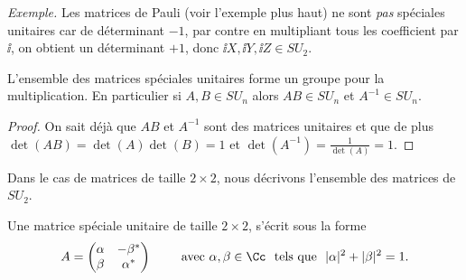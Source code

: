 \documentclass[11pt,class=report,crop=false]{standalone}
\begin{document}
\emph{Exemple.} Les matrices de Pauli (voir l'exemple plus haut) ne sont \emph{pas} spéciales unitaires car de déterminant $-1$, par contre en multipliant tous les coefficient par $\ii$, on obtient un déterminant $+1$, donc $\ii X, \ii Y, \ii Z \in SU_2$.

\begin{proposition}
L'ensemble des matrices spéciales unitaires forme un groupe pour la multiplication.
En particulier si $A, B \in SU_n$ alors $AB \in SU_n$ et $A^{-1} \in SU_n$.
\end{proposition}

\begin{proof}
On sait déjà que $AB$ et $A^{-1}$ sont des matrices unitaires et que de plus
$\det(AB) = \det(A)\det(B) = 1$ et $\det(A^{-1}) = \frac{1}{\det(A)} = 1$.
\end{proof}

Dans le cas de matrices de taille $2\times2$, nous décrivons l'ensemble des matrices de $SU_2$.
\begin{proposition}
Une matrice spéciale unitaire de taille $2\times 2$, s'écrit sous la forme
$$A = \begin{pmatrix}\alpha&-\beta^*\\\beta&\alpha^*\end{pmatrix}
\qquad\text{ avec }  \alpha,\beta\in \Cc \ \text { tels que } \ |\alpha|^2 + |\beta|^2 = 1.$$
\end{proposition}
\end{document}
